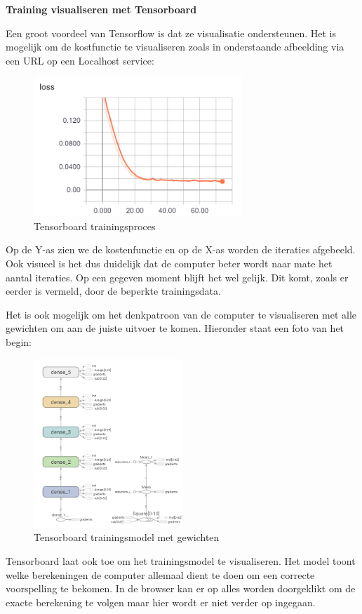 \textbf{Training visualiseren met Tensorboard}

Een groot voordeel van Tensorflow is dat ze visualisatie ondersteunen. Het is mogelijk om de kostfunctie te visualiseren zoals in onderstaande afbeelding via een URL op een Localhost service:

\vspace{2em}
\begin{figure}[h!]
\centering
\includegraphics[width=0.7\textwidth]{bachproef/img/training_tensor.png}
\caption{Tensorboard trainingsproces}
\end{figure}

Op de Y-as zien we de kostenfunctie en op de X-as worden de iteraties afgebeeld. Ook visueel is het dus duidelijk dat de computer beter wordt naar mate het aantal iteraties. Op een gegeven moment blijft het wel gelijk. Dit komt, zoals er eerder is vermeld, door de beperkte trainingsdata.

Het is ook mogelijk om het denkpatroon van de computer te visualiseren met alle gewichten om aan de juiste uitvoer te komen. Hieronder staat een foto van het begin:

\begin{figure}[h!]
\centering
\includegraphics[width=0.5\textwidth]{bachproef/img/tensorboard.png}
\caption{Tensorboard trainingsmodel met gewichten}
\end{figure}

Tensorboard laat ook toe om het trainingsmodel te visualiseren. Het model toont welke berekeningen de computer allemaal dient te doen om een correcte voorspelling te bekomen. In de browser kan er op alles worden doorgeklikt om de exacte berekening te volgen maar hier wordt er niet verder op ingegaan.